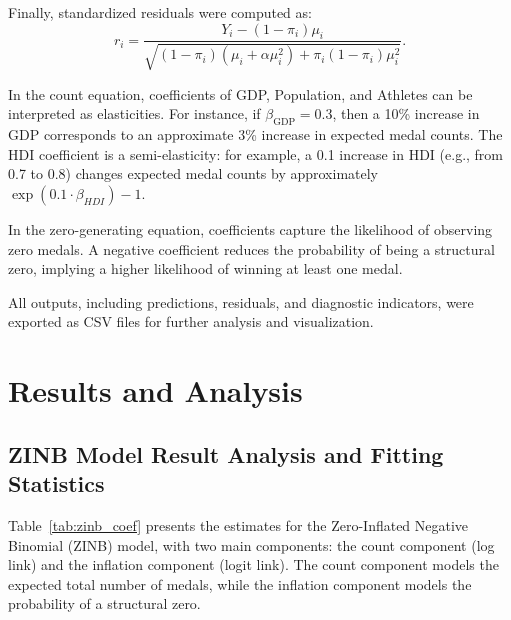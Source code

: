 \documentclass[11pt,twoside]{article}
\numberwithin{Theorem}{section}
\numberwithin{Definition}{section}
\numberwithin{Lemma}{section}
\numberwithin{Algorithm}{section}
\numberwithin{equation}{section}
\begin{document}
Finally, standardized residuals were computed as:
\begin{equation}
r_i = \frac{Y_i - (1 - \pi_i)\mu_i}{\sqrt{(1 - \pi_i)(\mu_i + \alpha \mu_i^2) + \pi_i(1 - \pi_i)\mu_i^2}}.
\label{eq:residual}
\end{equation}

In the count equation, coefficients of GDP, Population, and Athletes can be interpreted as elasticities. For instance, if $\beta_{\text{GDP}} = 0.3$, then a 10\% increase in GDP corresponds to an approximate 3\% increase in expected medal counts. The HDI coefficient is a semi-elasticity: for example, a 0.1 increase in HDI (e.g., from 0.7 to 0.8) changes expected medal counts by approximately $\exp(0.1 \cdot \beta_{HDI}) - 1$.  

In the zero-generating equation, coefficients capture the likelihood of observing zero medals. A negative coefficient reduces the probability of being a structural zero, implying a higher likelihood of winning at least one medal.  

All outputs, including predictions, residuals, and diagnostic indicators, were exported as CSV files for further analysis and visualization.


\section{Results and Analysis}
\subsection{ZINB Model Result Analysis and Fitting Statistics}

Table~\ref{tab:zinb_coef} presents the estimates for the Zero-Inflated Negative Binomial (ZINB) model, with two main components: the count component (log link) and the inflation component (logit link). The count component models the expected total number of medals, while the inflation component models the probability of a structural zero.
\end{document}
